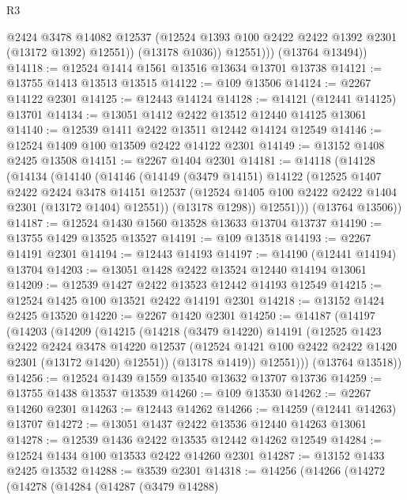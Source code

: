 \begin{lexlean}{R3}
\begin{coremodule}
                @2424
                @3478
                @14082
                @12537
                (@12524 @1393 @100 @2422 @2422 @1392 @2301 (@13172 @1392) @12551))
              (@13178 @1036))
            @12551)))
      (@13764 @13494))
@14118 := @12524 @1414 @1561 @13516 @13634 @13701 @13738
@14121 := @13755 @1413 @13513 @13515
@14122 := @109 @13506
@14124 := @2267 @14122 @2301
@14125 := @12443 @14124
@14128 := @14121 (@12441 @14125) @13701
@14134 := @13051 @1412 @2422 @13512 @12440 @14125 @13061
@14140 := @12539 @1411 @2422 @13511 @12442 @14124 @12549
@14146 := @12524 @1409 @100 @13509 @2422 @14122 @2301
@14149 := @13152 @1408 @2425 @13508
@14151 := @2267 @1404 @2301
@14181 := @14118
    (@14128
      (@14134
        (@14140
          (@14146
            (@14149
              (@3479 @14151)
              @14122
              (@12525
                @1407
                @2422
                @2424
                @3478
                @14151
                @12537
                (@12524 @1405 @100 @2422 @2422 @1404 @2301 (@13172 @1404) @12551))
              (@13178 @1298))
            @12551)))
      (@13764 @13506))
@14187 := @12524 @1430 @1560 @13528 @13633 @13704 @13737
@14190 := @13755 @1429 @13525 @13527
@14191 := @109 @13518
@14193 := @2267 @14191 @2301
@14194 := @12443 @14193
@14197 := @14190 (@12441 @14194) @13704
@14203 := @13051 @1428 @2422 @13524 @12440 @14194 @13061
@14209 := @12539 @1427 @2422 @13523 @12442 @14193 @12549
@14215 := @12524 @1425 @100 @13521 @2422 @14191 @2301
@14218 := @13152 @1424 @2425 @13520
@14220 := @2267 @1420 @2301
@14250 := @14187
    (@14197
      (@14203
        (@14209
          (@14215
            (@14218
              (@3479 @14220)
              @14191
              (@12525
                @1423
                @2422
                @2424
                @3478
                @14220
                @12537
                (@12524 @1421 @100 @2422 @2422 @1420 @2301 (@13172 @1420) @12551))
              (@13178 @1419))
            @12551)))
      (@13764 @13518))
@14256 := @12524 @1439 @1559 @13540 @13632 @13707 @13736
@14259 := @13755 @1438 @13537 @13539
@14260 := @109 @13530
@14262 := @2267 @14260 @2301
@14263 := @12443 @14262
@14266 := @14259 (@12441 @14263) @13707
@14272 := @13051 @1437 @2422 @13536 @12440 @14263 @13061
@14278 := @12539 @1436 @2422 @13535 @12442 @14262 @12549
@14284 := @12524 @1434 @100 @13533 @2422 @14260 @2301
@14287 := @13152 @1433 @2425 @13532
@14288 := @3539 @2301
@14318 := @14256
    (@14266
      (@14272
        (@14278
          (@14284
            (@14287
              (@3479 @14288)

\end{coremodule}
\end{lexlean}
